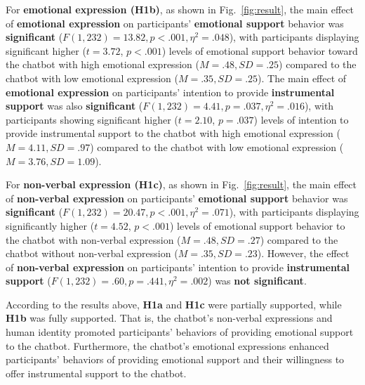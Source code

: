 For \textbf{emotional expression (H1b)}, as shown in Fig.~\ref{fig:result}, the main effect of \textbf{emotional expression} on participants' \textbf{emotional support} behavior was \textbf{significant} (\(F(1, 232) = 13.82, p < .001, \eta^2 = .048 \)), with participants displaying significant higher ($t=3.72$, $p<.001$) levels of emotional support behavior toward the chatbot with high emotional expression (\(M = .48, SD = .25 \)) compared to the chatbot with low emotional expression (\(M = .35, SD = .25 \)). 
The main effect of \textbf{emotional expression} on participants' intention to provide \textbf{instrumental support} was also \textbf{significant} (\(F(1, 232) = 4.41, p = .037, \eta^2 = .016 \)), with participants showing significant higher ($t=2.10$, $p = .037$) levels of intention to provide instrumental support to the chatbot with high emotional expression (\(M = 4.11, SD = .97 \)) compared to the chatbot with low emotional expression (\(M = 3.76, SD = 1.09 \)). 


For \textbf{non-verbal expression (H1c)}, as shown in Fig.~\ref{fig:result}, the main effect of \textbf{non-verbal expression} on participants' \textbf{emotional support} behavior was \textbf{significant} (\(F(1, 232) = 20.47, p < .001, \eta^2 = .071 \)), with participants displaying significantly higher ($t=4.52$, $p<.001$) levels of emotional support behavior to the chatbot with non-verbal expression (\(M = .48, SD = .27 \)) compared to the chatbot without non-verbal expression (\(M = .35, SD = .23 \)). 
However, the effect of \textbf{non-verbal expression} on participants' intention to provide \textbf{instrumental support} (\(F(1, 232) = .60, p = .441, \eta^2 = .002 \)) was \textbf{not significant}.


According to the results above, \textbf{H1a} and \textbf{H1c} were partially supported, while \textbf{H1b} was fully supported. 
That is, the chatbot's non-verbal expressions and human identity promoted participants' behaviors of providing emotional support to the chatbot. Furthermore, the chatbot's emotional expressions enhanced participants' behaviors of providing emotional support and their willingness to offer instrumental support to the chatbot.


